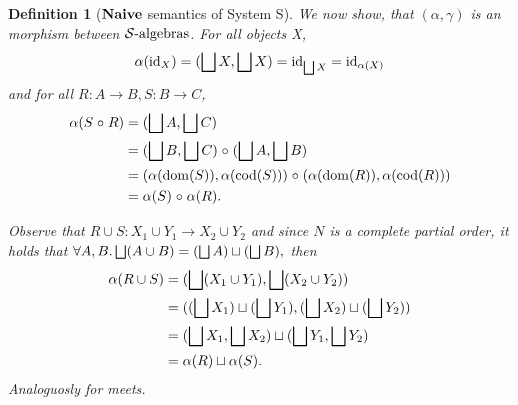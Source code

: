 \documentclass{article}
\newtheorem{definition}[theorem]{Definition}
\newcommand{\dom}{\ensuremath \operatorname{dom}}
\newcommand{\cod}{\ensuremath \operatorname{cod}}
\newcommand{\Cat}[1]{\ensuremath \mathbf{#1}}
\newcommand{\id}{\ensuremath \operatorname{id}}
\newcommand{\Naive}{\ensuremath \Cat{Naive}}
\newcommand{\lub}{\ensuremath \bigsqcup}
\newcommand{\SAlgebras}{\ensuremath \mathcal{S}\text{-algebras}}
\newcommand{\comp}{\ensuremath \mathrel{\circ}}
\begin{document}
\begin{definition}[$\Naive$ semantics of System S]
  We now show, that $(\alpha,\gamma)$ is an morphism between $\SAlgebras$. For all objects X,
  \begin{align*}
    \alpha(\id_X) = (\lub X, \lub X) = \id_{\lub X} = \id_{\alpha(X)}
  \end{align*}
  and for all $R : A \rightarrow B, S : B \rightarrow C$,
  \begin{align*}
    \alpha(S \comp R) &= (\lub A, \lub C) \\
                      &= (\lub B, \lub C) \comp (\lub A, \lub B) \\
                      &= (\alpha(\dom(S)), \alpha(\cod(S))) \comp (\alpha(\dom(R)), \alpha(\cod(R))) \\
                      &= \alpha(S) \comp \alpha(R).
  \end{align*}

  Observe that $R \cup S : X_1 \cup Y_1 \rightarrow X_2 \cup Y_2$ and since $N$ is a complete partial order, it holds that $\forall A,B. \lub(A \cup B) = (\lub A) \sqcup (\lub B),$ then
 \begin{align*}
    \alpha(R \cup S) &= (\lub(X_1 \cup Y_1),\lub(X_2\cup Y_2)) \\
                     &= ((\lub X_1) \sqcup (\lub Y_1), (\lub X_2) \sqcup (\lub Y_2)) \\
                     &= (\lub X_1,\lub X_2) \sqcup (\lub Y_1, \lub Y_2) \\
                     &= \alpha(R) \sqcup \alpha(S).
 \end{align*}
 Analoguosly for meets.
\end{definition}

\end{document}

